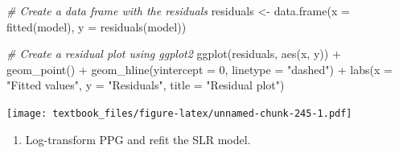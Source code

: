 \documentclass[
  11pt,
]{book}
\newenvironment{Shaded}{\begin{snugshade}}{\end{snugshade}}
\newcommand{\AttributeTok}[1]{\textcolor[rgb]{0.77,0.63,0.00}{#1}}
\newcommand{\CommentTok}[1]{\textcolor[rgb]{0.56,0.35,0.01}{\textit{#1}}}
\newcommand{\DecValTok}[1]{\textcolor[rgb]{0.00,0.00,0.81}{#1}}
\newcommand{\FunctionTok}[1]{\textcolor[rgb]{0.00,0.00,0.00}{#1}}
\newcommand{\NormalTok}[1]{#1}
\newcommand{\OtherTok}[1]{\textcolor[rgb]{0.56,0.35,0.01}{#1}}
\newcommand{\SpecialCharTok}[1]{\textcolor[rgb]{0.00,0.00,0.00}{#1}}
\newcommand{\StringTok}[1]{\textcolor[rgb]{0.31,0.60,0.02}{#1}}
\providecommand{\tightlist}{%
  \setlength{\itemsep}{0pt}\setlength{\parskip}{0pt}}
\theoremstyle{definition}
\theoremstyle{definition}
\theoremstyle{definition}
\theoremstyle{definition}
\theoremstyle{remark}
\begin{document}
\begin{Shaded}
\begin{Highlighting}[]
\CommentTok{\# Create a data frame with the residuals}
\NormalTok{residuals }\OtherTok{\textless{}{-}} \FunctionTok{data.frame}\NormalTok{(}\AttributeTok{x =} \FunctionTok{fitted}\NormalTok{(model), }\AttributeTok{y =} \FunctionTok{residuals}\NormalTok{(model))}

\CommentTok{\# Create a residual plot using ggplot2}
\FunctionTok{ggplot}\NormalTok{(residuals, }\FunctionTok{aes}\NormalTok{(x, y)) }\SpecialCharTok{+}
  \FunctionTok{geom\_point}\NormalTok{() }\SpecialCharTok{+}
  \FunctionTok{geom\_hline}\NormalTok{(}\AttributeTok{yintercept =} \DecValTok{0}\NormalTok{, }\AttributeTok{linetype =} \StringTok{"dashed"}\NormalTok{) }\SpecialCharTok{+}
  \FunctionTok{labs}\NormalTok{(}\AttributeTok{x =} \StringTok{"Fitted values"}\NormalTok{, }\AttributeTok{y =} \StringTok{"Residuals"}\NormalTok{, }\AttributeTok{title =} \StringTok{"Residual plot"}\NormalTok{)}
\end{Highlighting}
\end{Shaded}

\texttt{[image: textbook\_files/figure-latex/unnamed-chunk-245-1.pdf]}
\newpage

\begin{enumerate}
\def\labelenumi{(\alph{enumi})}
\setcounter{enumi}{4}
\tightlist
\item
  Log-transform PPG and refit the SLR model.
\end{enumerate}
\end{document}
